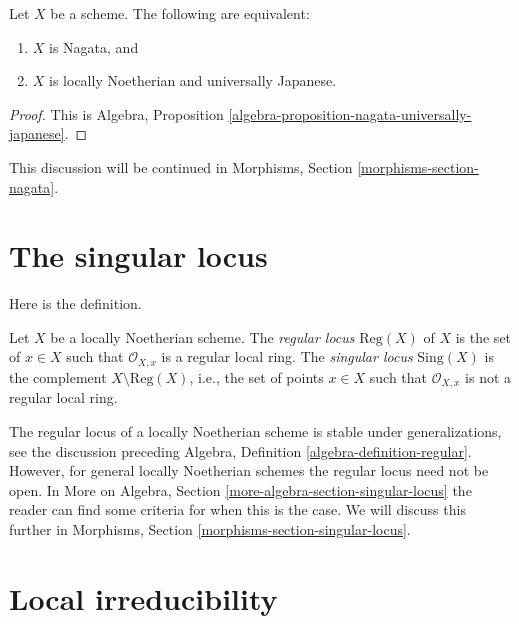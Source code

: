 \begin{lemma}
\label{lemma-nagata-universally-Japanese}
Let $X$ be a scheme.
The following are equivalent:
\begin{enumerate}
\item $X$ is Nagata, and
\item $X$ is locally Noetherian and universally Japanese.
\end{enumerate}
\end{lemma}

\begin{proof}
This is
Algebra, Proposition \ref{algebra-proposition-nagata-universally-japanese}.
\end{proof}

\noindent
This discussion will be continued in
Morphisms, Section \ref{morphisms-section-nagata}.





\section{The singular locus}
\label{section-singular-locus}

\noindent
Here is the definition.

\begin{definition}
\label{definition-singular-locus}
Let $X$ be a locally Noetherian scheme. The {\it regular locus}
$\text{Reg}(X)$ of $X$ is the set of $x \in X$ such that $\mathcal{O}_{X, x}$
is a regular local ring. The {\it singular locus} $\text{Sing}(X)$ is the
complement $X \setminus \text{Reg}(X)$, i.e., the set of points $x \in X$
such that $\mathcal{O}_{X, x}$ is not a regular local ring.
\end{definition}

\noindent
The regular locus of a locally Noetherian scheme is stable under
generalizations, see the discussion preceding
Algebra, Definition \ref{algebra-definition-regular}.
However, for general locally Noetherian schemes the regular locus
need not be open. In
More on Algebra, Section \ref{more-algebra-section-singular-locus}
the reader can find some criteria for when this is the case.
We will discuss this further in
Morphisms, Section \ref{morphisms-section-singular-locus}.






\section{Local irreducibility}
\label{section-unibranch}

